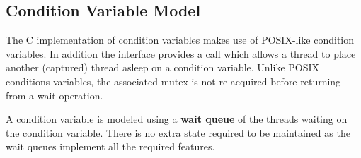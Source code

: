 \subsection{Condition Variable Model}

The C implementation of condition variables
makes use of POSIX-like condition
variables. In addition the interface provides a call which allows a
thread to place another (captured) thread asleep on a condition
variable. Unlike POSIX conditions variables, the associated mutex
is not re-acquired before returning from a wait operation.

A condition variable is modeled using a {\bf wait queue} of the
threads waiting on the condition variable. There is no extra state
required to be maintained as the wait queues implement all the
required features.

